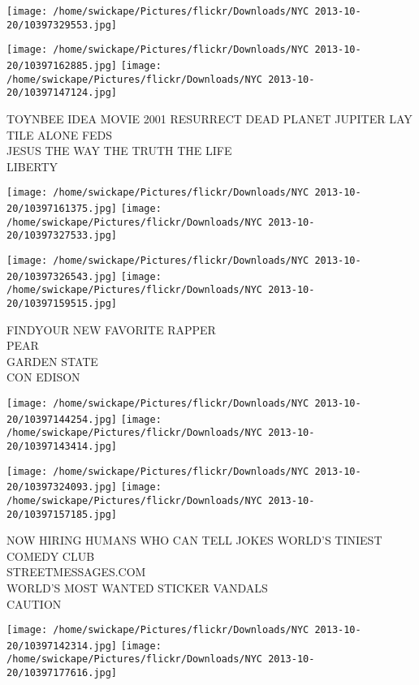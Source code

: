 \documentclass[10pt,letterpaper]{article}
\begin{document}
\texttt{[image: /home/swickape/Pictures/flickr/Downloads/NYC 2013-10-20/10397329553.jpg]}

\vspace{0.25in}
\texttt{[image: /home/swickape/Pictures/flickr/Downloads/NYC 2013-10-20/10397162885.jpg]}
\texttt{[image: /home/swickape/Pictures/flickr/Downloads/NYC 2013-10-20/10397147124.jpg]}

TOYNBEE IDEA MOVIE 2001 RESURRECT DEAD PLANET JUPITER LAY TILE ALONE FEDS\\
JESUS THE WAY THE TRUTH THE LIFE\\
LIBERTY\\
\pagebreak

\texttt{[image: /home/swickape/Pictures/flickr/Downloads/NYC 2013-10-20/10397161375.jpg]}
\texttt{[image: /home/swickape/Pictures/flickr/Downloads/NYC 2013-10-20/10397327533.jpg]}

\texttt{[image: /home/swickape/Pictures/flickr/Downloads/NYC 2013-10-20/10397326543.jpg]}
\texttt{[image: /home/swickape/Pictures/flickr/Downloads/NYC 2013-10-20/10397159515.jpg]}

FINDYOUR NEW FAVORITE RAPPER\\
PEAR\\
GARDEN STATE\\
CON EDISON\\
\pagebreak

\texttt{[image: /home/swickape/Pictures/flickr/Downloads/NYC 2013-10-20/10397144254.jpg]}
\texttt{[image: /home/swickape/Pictures/flickr/Downloads/NYC 2013-10-20/10397143414.jpg]}

\texttt{[image: /home/swickape/Pictures/flickr/Downloads/NYC 2013-10-20/10397324093.jpg]}
\texttt{[image: /home/swickape/Pictures/flickr/Downloads/NYC 2013-10-20/10397157185.jpg]}

NOW HIRING HUMANS WHO CAN TELL JOKES WORLD'S TINIEST COMEDY CLUB\\
STREETMESSAGES.COM\\
WORLD'S MOST WANTED STICKER VANDALS\\
CAUTION\\
\pagebreak

\texttt{[image: /home/swickape/Pictures/flickr/Downloads/NYC 2013-10-20/10397142314.jpg]}
\texttt{[image: /home/swickape/Pictures/flickr/Downloads/NYC 2013-10-20/10397177616.jpg]}
\end{document}
